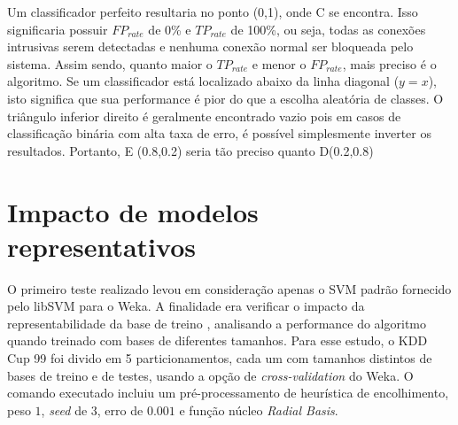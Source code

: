 \par Um classificador perfeito resultaria no ponto (0,1), onde C se encontra. Isso significaria possuir $FP_{rate}$ de
0\% e $TP_{rate}$ de 100\%, ou seja, todas as conexões intrusivas serem detectadas e nenhuma conexão normal ser
bloqueada pelo sistema. Assim sendo, quanto maior o $TP_{rate}$ e menor o $FP_{rate}$, mais preciso é o algoritmo.
 Se um classificador está localizado abaixo da linha diagonal ($y = x$), isto significa que sua performance é pior do
 que a escolha aleatória de classes. O triângulo inferior direito é geralmente encontrado vazio pois em casos de
 classificação binária com alta taxa de erro, é possível simplesmente inverter os resultados. Portanto, E (0.8,0.2)
 seria tão preciso quanto D(0.2,0.8)


\section{Impacto de modelos representativos}
O primeiro teste realizado levou em consideração apenas o SVM padrão fornecido pelo libSVM para o Weka. A finalidade
era verificar o impacto da representabilidade da base de treino \cite{yaman11}, analisando a performance do algoritmo
quando treinado com bases de diferentes tamanhos. Para esse estudo, o KDD Cup 99 foi divido em 5 particionamentos,
cada um com tamanhos distintos de bases de treino e de testes, usando a opção de \textit{cross-validation} do Weka.
O comando executado incluiu um pré-processamento de heurística de encolhimento, peso $1$, \emph{seed} de $3$, erro de
$0.001$ e função núcleo \textit{Radial Basis}.

